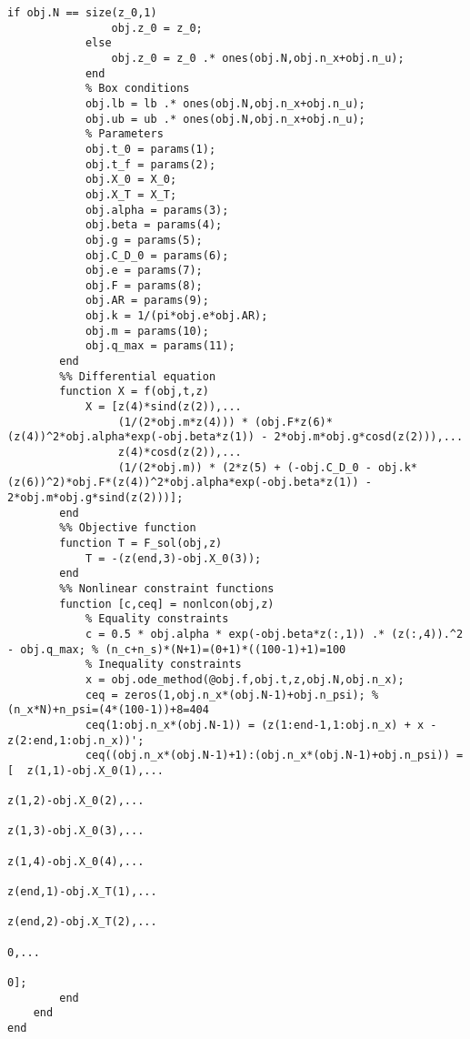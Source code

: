\begin{lstlisting}[style=num_octave, caption={Matlab Programmcode von \texttt{maximalrangeflight.m}.}, label=code:direct_maximalrangeflight]
            if obj.N == size(z_0,1)
                obj.z_0 = z_0;
            else
                obj.z_0 = z_0 .* ones(obj.N,obj.n_x+obj.n_u);
            end
            % Box conditions
            obj.lb = lb .* ones(obj.N,obj.n_x+obj.n_u);
            obj.ub = ub .* ones(obj.N,obj.n_x+obj.n_u);
            % Parameters
            obj.t_0 = params(1);
            obj.t_f = params(2);
            obj.X_0 = X_0;
            obj.X_T = X_T;
            obj.alpha = params(3);
            obj.beta = params(4);
            obj.g = params(5);
            obj.C_D_0 = params(6);
            obj.e = params(7);
            obj.F = params(8);
            obj.AR = params(9);
            obj.k = 1/(pi*obj.e*obj.AR);
            obj.m = params(10);
            obj.q_max = params(11);
        end
        %% Differential equation
        function X = f(obj,t,z)
            X = [z(4)*sind(z(2)),...
                 (1/(2*obj.m*z(4))) * (obj.F*z(6)*(z(4))^2*obj.alpha*exp(-obj.beta*z(1)) - 2*obj.m*obj.g*cosd(z(2))),...
                 z(4)*cosd(z(2)),...
                 (1/(2*obj.m)) * (2*z(5) + (-obj.C_D_0 - obj.k*(z(6))^2)*obj.F*(z(4))^2*obj.alpha*exp(-obj.beta*z(1)) - 2*obj.m*obj.g*sind(z(2)))];
        end
        %% Objective function
        function T = F_sol(obj,z)
            T = -(z(end,3)-obj.X_0(3));
        end
        %% Nonlinear constraint functions
        function [c,ceq] = nonlcon(obj,z)
            % Equality constraints
            c = 0.5 * obj.alpha * exp(-obj.beta*z(:,1)) .* (z(:,4)).^2 - obj.q_max; % (n_c+n_s)*(N+1)=(0+1)*((100-1)+1)=100
            % Inequality constraints
            x = obj.ode_method(@obj.f,obj.t,z,obj.N,obj.n_x);
            ceq = zeros(1,obj.n_x*(obj.N-1)+obj.n_psi); % (n_x*N)+n_psi=(4*(100-1))+8=404
            ceq(1:obj.n_x*(obj.N-1)) = (z(1:end-1,1:obj.n_x) + x - z(2:end,1:obj.n_x))';
            ceq((obj.n_x*(obj.N-1)+1):(obj.n_x*(obj.N-1)+obj.n_psi)) = [  z(1,1)-obj.X_0(1),...
                                                                          z(1,2)-obj.X_0(2),...
                                                                          z(1,3)-obj.X_0(3),...
                                                                          z(1,4)-obj.X_0(4),...
                                                                        z(end,1)-obj.X_T(1),...
                                                                        z(end,2)-obj.X_T(2),...
                                                                                          0,...
                                                                                          0];
        end
    end
end
\end{lstlisting}













